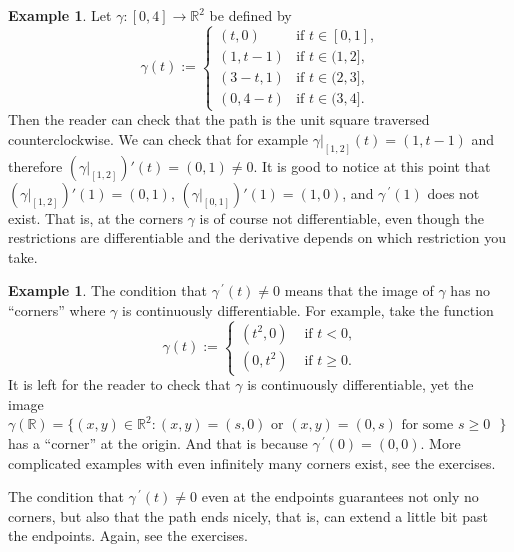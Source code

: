 \documentclass[12pt]{book}
\newcommand{\R}{{\mathbb{R}}}
\theoremstyle{plain}
\theoremstyle{remark}
\theoremstyle{definition}
\theoremstyle{exercise}
\theoremstyle{example}
\newtheorem{example}[thm]{Example}
\begin{document}
\begin{example} \label{mv:example:unitsquarepath}
Let $\gamma \colon [0,4] \to \R^2$ be defined by
\begin{equation*}
\gamma(t) :=
\begin{cases}
(t,0) & \text{if $t \in [0,1]$,}\\
(1,t-1) & \text{if $t \in (1,2]$,}\\
(3-t,1) & \text{if $t \in (2,3]$,}\\
(0,4-t) & \text{if $t \in (3,4]$.}
\end{cases}
\end{equation*}
Then the reader can check that the path is the unit square traversed
counterclockwise.  We can check that for example
$\gamma|_{[1,2]}(t) = (1,t-1)$ and therefore
$(\gamma|_{[1,2]})'(t) = (0,1) \not= 0$.  It is good to notice at this point
that
$(\gamma|_{[1,2]})'(1) = (0,1)$,
$(\gamma|_{[0,1]})'(1) = (1,0)$, and
$\gamma^{\:\prime}(1)$ does not exist.  That is, at the corners $\gamma$ is of course
not differentiable, even though the restrictions are differentiable and the
derivative depends on which restriction you take.
\end{example}

\begin{example}
The condition that $\gamma^{\:\prime}(t) \not= 0$ means that the image of $\gamma$
has no ``corners'' where $\gamma$ is continuously differentiable.  For example,
take the function
\begin{equation*}
\gamma(t) :=
\begin{cases}
(t^2,0) & \text{ if $t < 0$,}\\
(0,t^2) & \text{ if $t \geq 0$.}
\end{cases}
\end{equation*}
It is left for the reader to check that $\gamma$ is continuously
differentiable, yet the image $\gamma(\R) = \{ (x,y) \in \R^2 : (x,y) =
(s,0) \text{ or } (x,y) = (0,s) \text{ for some $s \geq 0$ } \}$ has a
``corner'' at the origin.  And that is because $\gamma^{\:\prime}(0) = (0,0)$.
More complicated examples with even infinitely many corners exist,
see the exercises.
\end{example}

The condition that $\gamma^{\:\prime}(t) \not= 0$ even at the endpoints guarantees
not only no corners, but also that the path ends nicely, that is, can
extend a little bit past the endpoints.  Again, see the exercises.
\end{document}
